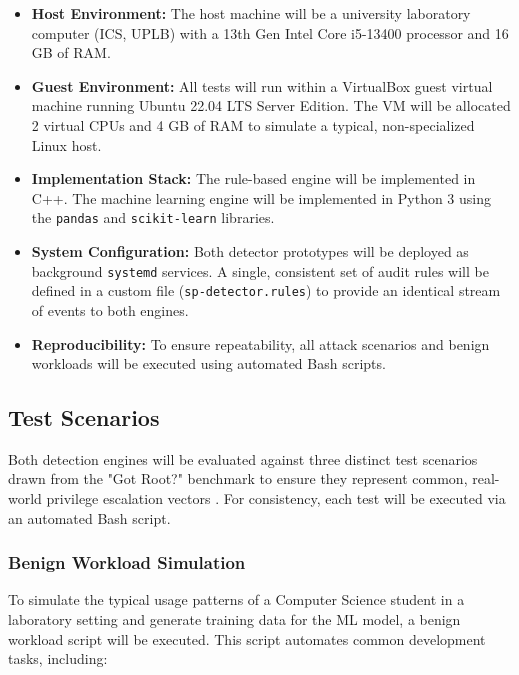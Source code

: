 \documentclass[journal]{./IEEEtran}
\begin{document}
\begin{itemize}
    \item \textbf{Host Environment:} The host machine will be a university laboratory computer (ICS, UPLB) with a 13th Gen Intel Core i5-13400 processor and 16 GB of RAM.
    
    \item \textbf{Guest Environment:} All tests will run within a VirtualBox guest virtual machine running Ubuntu 22.04 LTS Server Edition. The VM will be allocated 2 virtual CPUs and 4 GB of RAM to simulate a typical, non-specialized Linux host.
    
    \item \textbf{Implementation Stack:} The rule-based engine will be implemented in C++. The machine learning engine will be implemented in Python 3 using the \texttt{pandas} and \texttt{scikit-learn} libraries.
    
    \item \textbf{System Configuration:} Both detector prototypes will be deployed as background \texttt{systemd} services. A single, consistent set of audit rules will be defined in a custom file (\texttt{sp-detector.rules}) to provide an identical stream of events to both engines.
    
    \item \textbf{Reproducibility:} To ensure repeatability, all attack scenarios and benign workloads will be executed using automated Bash scripts.
\end{itemize}

\subsection{Test Scenarios}\label{sec:test-scenarios}
Both detection engines will be evaluated against three distinct test scenarios drawn from the "Got Root?" benchmark to ensure they represent common, real-world privilege escalation vectors \cite{happe2024}. For consistency, each test will be executed via an automated Bash script.

\subsubsection{\textbf{Benign Workload Simulation}}
To simulate the typical usage patterns of a Computer Science student in a laboratory setting and generate training data for the ML model, a benign workload script will be executed. This script automates common development tasks, including:
\end{document}
